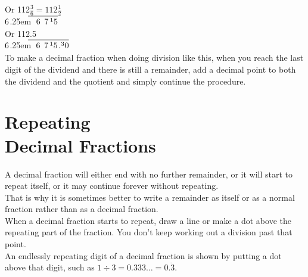 \documentclass{article}
\newcommand\mylongdiv[2]{%
$\strut#1$\kern.25em\smash{\raise.3ex\hbox{$\big)$}}$\mkern-8mu
        \overline{\quad\strut#2}$}
\begin{document}
Or
\hspace*{12.1ex}1\hspace{1.2ex}1\hspace{1.1ex}2\hspace{1ex}$\frac{3}{6} = 112 \frac{1}{2}$\\
\hspace*{7em}\mylongdiv{6}{6\hspace{1.1ex}7\hspace{0.4ex}{^1}5}\\

Or
\hspace*{12.1ex}1\hspace{1.3ex}1\hspace{0.9ex}2\hspace{0.7ex}.\hspace{0.8ex}5\\
\hspace*{7em}\mylongdiv{6}{6\hspace{1.1ex}7\hspace{0.4ex}{^1}5\hspace{0.3ex}.^30}\\

To make a decimal fraction when doing division like this, when you reach the last digit of the dividend and there is still a remainder, add a decimal point to both the dividend and the quotient and simply continue the procedure.\\

\newpage

\section{Repeating\\Decimal Fractions}

A decimal fraction  will either end with no further remainder, or it will start to repeat itself, or it may continue forever without repeating.\\

That is why it is sometimes better to write a remainder as itself or as a normal fraction rather than as a decimal fraction.\\

When a decimal fraction starts to repeat, draw a line or make a dot above the repeating part of the fraction. You don't keep working out a division past that point.\\

An endlessly repeating digit of a decimal fraction is shown by putting a dot above that digit, such as $1 \div 3 = 0.333\ldots=0.\dot{3}.$\\
\end{document}
